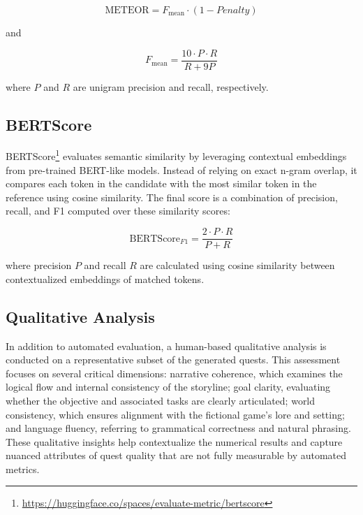 \begin{equation}
  \text{METEOR} = F_{\text{mean}} \cdot (1 - Penalty)
\end{equation}

and

\begin{equation}
  F_{\text{mean}} = \frac{10 \cdot P \cdot R}{R + 9P}
\end{equation}

where \( P \) and \( R \) are unigram precision and recall, respectively.

\subsection{BERTScore}

BERTScore\footnote{\url{https://huggingface.co/spaces/evaluate-metric/bertscore}} evaluates semantic similarity by leveraging contextual embeddings from
pre-trained BERT-like models. Instead of relying on exact n-gram overlap, it compares
each token in the candidate with the most similar token in the reference using cosine
similarity. The final score is a combination of precision, recall, and F1 computed over
these similarity scores:

\begin{equation}
  \text{BERTScore}_{F1} = \frac{2 \cdot P \cdot R}{P + R}
\end{equation}

where precision \( P \) and recall \( R \) are calculated using cosine similarity between contextualized
embeddings of matched tokens.

\subsection{Qualitative Analysis}

In addition to automated evaluation, a human-based qualitative analysis is conducted on
a representative subset of the generated quests. This assessment focuses on several critical
dimensions: narrative coherence, which examines the logical flow and internal consistency
of the storyline; goal clarity, evaluating whether the objective and associated tasks are
clearly articulated; world consistency, which ensures alignment with the fictional game's
lore and setting; and language fluency, referring to grammatical correctness and natural
phrasing. These qualitative insights help contextualize the numerical results and capture
nuanced attributes of quest quality that are not fully measurable by automated metrics.

